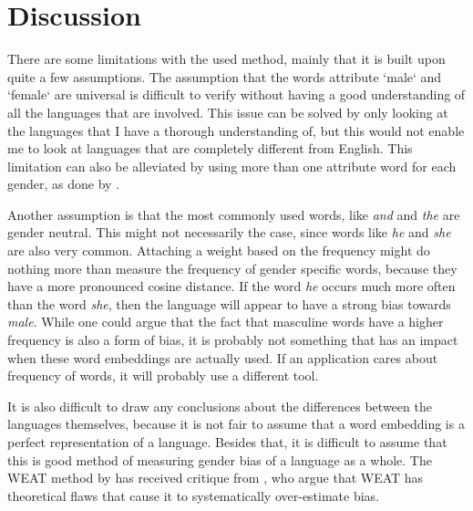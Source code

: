 \section{Discussion}
%
There are some limitations with the used method, mainly that it is built upon quite a few
assumptions.
The assumption that the words attribute `male` and `female` are universal is difficult
to verify without having a good understanding of all the languages that are involved.
This issue can be solved by only looking at the languages that I have a thorough
understanding of, but this would not enable me to look at languages that are completely
different from English. This limitation can also be alleviated by using more than one
attribute word for each gender, as done by \textcite{caliskan_2017_semantics_language_corpora}.

Another assumption is that the most commonly used words, like \textit{and} and \textit{the}
are gender neutral. This might not necessarily the case, since words like \textit{he} and
\textit{she} are also very common. Attaching a weight based on the frequency might do
nothing more than measure the frequency of gender specific words, because they have a
more pronounced cosine distance. If the word \textit{he} occurs much more often than
the word \textit{she}, then the language will appear to have a strong bias towards
\textit{male}. While one could argue that the fact that masculine words have a higher
frequency is also a form of bias, it is probably not something that has an impact when
these word embeddings are actually used. If an application cares about frequency of words,
it will probably use a different tool.

It is also difficult to draw any conclusions about the differences between the languages
themselves, because it is not fair to assume that a word embedding is a perfect
representation of a language. Besides that, it is difficult to assume that this is
good method of measuring gender bias of a language as a whole. The WEAT method by
\textcite{caliskan_2017_semantics_language_corpora} has received critique from
\textcite{ethayarajh-etal-2019-understanding}, who argue that WEAT has theoretical flaws 
that cause it to systematically over-estimate bias.
